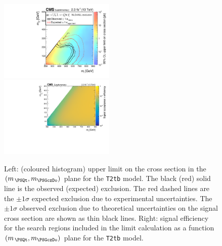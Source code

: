 \clearpage
\begin{figure}[!h]
  \begin{center}
    \includegraphics[width=0.49\textwidth]{Supplementary/RA1T2tbXSEC_aux} \, 
    \includegraphics[width=0.49\textwidth]{Supplementary/T2tb_merging_4_cats_aux} \,     
  \end{center}
  \caption{Left: (coloured histogram) upper limit on the cross section in the $(m_{\,\PSQt}, m_{\PSGczDo})$ plane for the \texttt{T2tb} model. 
  The black (red) solid line is the observed (expected) exclusion. The red dashed lines are the $\pm1\sigma$ expected exclusion due to experimental uncertainties. 
  The $\pm1\sigma$ observed exclusion due to theoretical uncertainties on the signal cross section are shown as thin black lines. 
  Right: signal efficiency for the search regions included in the limit calculation as a function $(m_{\,\PSQt}, m_{\PSGczDo})$ plane for the \texttt{T2tb} model. 
  \label{fig:T2tb_excl}}
\end{figure}



